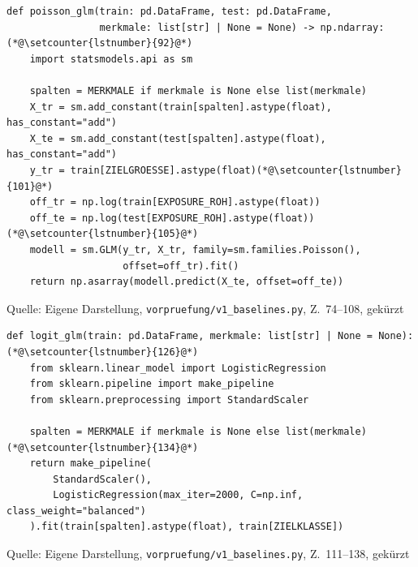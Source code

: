 \documentclass[12pt,a4paper]{article}
\newcommand{\tabquelle}[1][Eigene Darstellung]{%
  \par\setlength{\parskip}{0pt}\vspace{3pt}%
  {\setstretch{1}\fontsize{9pt}{11pt}\selectfont\raggedright Quelle: #1\par}%
}
\begin{document}
\begin{quellcode}[htbp]
\caption{Poisson-Modell mit Offset, Stufe 2 der Menge}
\label{lst:poisson}\vspace{-3.5pt}
\begin{lstlisting}[style=pythonstil,firstnumber=74]
def poisson_glm(train: pd.DataFrame, test: pd.DataFrame,
                merkmale: list[str] | None = None) -> np.ndarray:(*@\setcounter{lstnumber}{92}@*)
    import statsmodels.api as sm
 
    spalten = MERKMALE if merkmale is None else list(merkmale)
    X_tr = sm.add_constant(train[spalten].astype(float), has_constant="add")
    X_te = sm.add_constant(test[spalten].astype(float),  has_constant="add")
    y_tr = train[ZIELGROESSE].astype(float)(*@\setcounter{lstnumber}{101}@*)
    off_tr = np.log(train[EXPOSURE_ROH].astype(float))
    off_te = np.log(test[EXPOSURE_ROH].astype(float))(*@\setcounter{lstnumber}{105}@*)
    modell = sm.GLM(y_tr, X_tr, family=sm.families.Poisson(),
                    offset=off_tr).fit()
    return np.asarray(modell.predict(X_te, offset=off_te))
\end{lstlisting}
\tabquelle[Eigene Darstellung, \texttt{vorpruefung/v1\_baselines.py}, Z.~74--108, gekürzt]
\end{quellcode}
 
\begin{quellcode}[htbp]
\caption{Multinomiales Logit, Stufe 2 der Struktur}
\label{lst:logit}\vspace{-3.5pt}
\begin{lstlisting}[style=pythonstil,firstnumber=111]
def logit_glm(train: pd.DataFrame, merkmale: list[str] | None = None):(*@\setcounter{lstnumber}{126}@*)
    from sklearn.linear_model import LogisticRegression
    from sklearn.pipeline import make_pipeline
    from sklearn.preprocessing import StandardScaler
 
    spalten = MERKMALE if merkmale is None else list(merkmale)(*@\setcounter{lstnumber}{134}@*)
    return make_pipeline(
        StandardScaler(),
        LogisticRegression(max_iter=2000, C=np.inf, class_weight="balanced")
    ).fit(train[spalten].astype(float), train[ZIELKLASSE])
\end{lstlisting}
\tabquelle[Eigene Darstellung, \texttt{vorpruefung/v1\_baselines.py}, Z.~111--138, gekürzt]
\end{quellcode}
\end{document}
